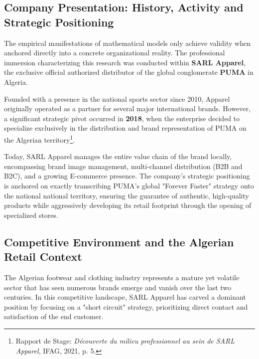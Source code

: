 \documentclass[12pt,a4paper]{report}
\begin{document}
\subsection{Company Presentation: History, Activity and Strategic Positioning}
The empirical manifestations of mathematical models only achieve validity when anchored directly into a concrete organizational reality. The professional immersion characterizing this research was conducted within \textbf{SARL Apparel}, the exclusive official authorized distributor of the global conglomerate \textbf{PUMA} in Algeria. 

Founded with a presence in the national sports sector since 2010, Apparel originally operated as a partner for several major international brands. However, a significant strategic pivot occurred in \textbf{2018}, when the enterprise decided to specialize exclusively in the distribution and brand representation of PUMA on the Algerian territory\footnote{Rapport de Stage: \textit{Découverte du milieu professionnel au sein de SARL Apparel}, IFAG, 2021, p. 5.}. 

Today, SARL Apparel manages the entire value chain of the brand locally, encompassing brand image management, multi-channel distribution (B2B and B2C), and a growing E-commerce presence. The company's strategic positioning is anchored on exactly transcribing PUMA's global "Forever Faster" strategy onto the national national territory, ensuring the guarantee of authentic, high-quality products while aggressively developing its retail footprint through the opening of specialized stores.

\subsection{Competitive Environment and the Algerian Retail Context}
The Algerian footwear and clothing industry represents a mature yet volatile sector that has seen numerous brands emerge and vanish over the last two centuries. In this competitive landscape, SARL Apparel has carved a dominant position by focusing on a "short circuit" strategy, prioritizing direct contact and satisfaction of the end customer.
\end{document}
